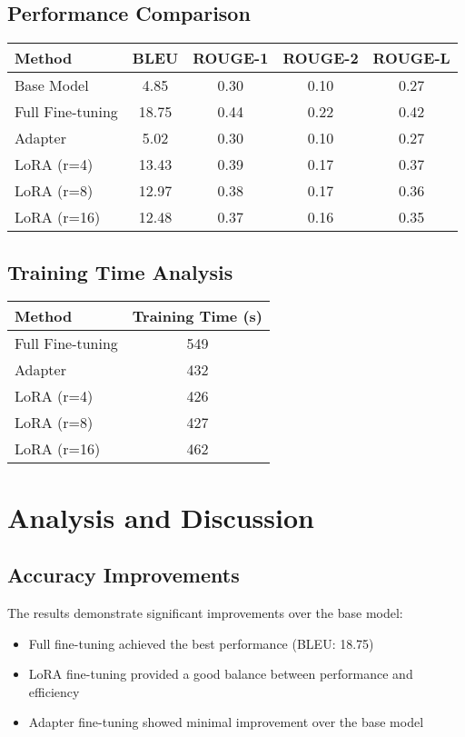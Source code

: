 \documentclass[conference]{IEEEtran}
\begin{document}
\subsection{Performance Comparison}
\begin{center}
\begin{tabular}{lcccc}
\toprule
Method & BLEU & ROUGE-1 & ROUGE-2 & ROUGE-L \\
\midrule
Base Model & 4.85 & 0.30 & 0.10 & 0.27 \\
Full Fine-tuning & 18.75 & 0.44 & 0.22 & 0.42 \\
Adapter & 5.02 & 0.30 & 0.10 & 0.27 \\
LoRA (r=4) & 13.43 & 0.39 & 0.17 & 0.37 \\
LoRA (r=8) & 12.97 & 0.38 & 0.17 & 0.36 \\
LoRA (r=16) & 12.48 & 0.37 & 0.16 & 0.35 \\
\bottomrule
\end{tabular}
\end{center}

\subsection{Training Time Analysis}
\begin{center}
\begin{tabular}{lc}
\toprule
Method & Training Time (s) \\
\midrule
Full Fine-tuning & 549 \\
Adapter & 432 \\
LoRA (r=4) & 426 \\
LoRA (r=8) & 427 \\
LoRA (r=16) & 462 \\
\bottomrule
\end{tabular}
\end{center}

\section{Analysis and Discussion}

\subsection{Accuracy Improvements}
The results demonstrate significant improvements over the base model:
\begin{itemize}
    \item Full fine-tuning achieved the best performance (BLEU: 18.75)
    \item LoRA fine-tuning provided a good balance between performance and efficiency
    \item Adapter fine-tuning showed minimal improvement over the base model
\end{itemize}
\end{document}
